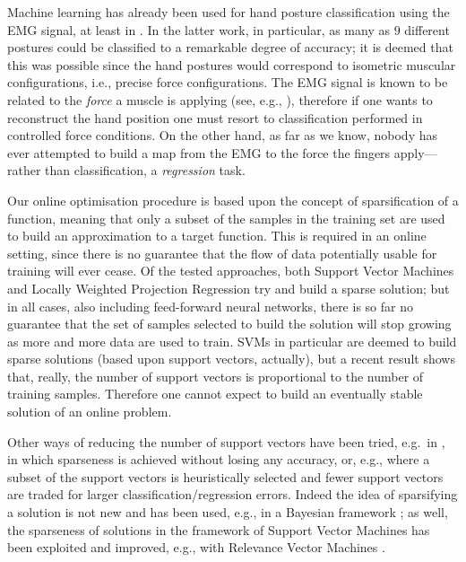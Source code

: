 Machine learning has already been used for hand posture classification
using the EMG signal, at least in \cite{dunlop,fukuda,smagt}. In the
latter work, in particular, as many as $9$ different postures could be
classified to a remarkable degree of accuracy; it is deemed that this
was possible since the hand postures would correspond to isometric
muscular configurations, i.e., precise force configurations. The EMG
signal is known to be related to the \emph{force} a muscle is applying
(see, e.g., \cite{deluca}), therefore if one wants to reconstruct the
hand position one must resort to classification performed in
controlled force conditions. On the other hand, as far as we know,
nobody has ever attempted to build a map from the EMG to the force the
fingers apply---rather than classification, a \emph{regression}
task.

Our online optimisation procedure is based upon the concept of
sparsification of a function, meaning that only a subset of the
samples in the training set are used to build an approximation to a
target function. This is required in an online setting, since there is
no guarantee that the flow of data potentially usable for training
will ever cease. Of the tested approaches, both Support Vector
Machines and Locally Weighted Projection Regression try and build a
sparse solution; but in all cases, also including feed-forward neural networks,
there is so far no guarantee that the set of samples selected to build
the solution will stop growing as more and more data are used to
train. SVMs in particular are deemed to build sparse solutions (based
upon support vectors, actually), but a recent result
\cite{Steinwart03} shows that, really, the number of support vectors
is proportional to the number of training samples. Therefore one
cannot expect to build an eventually stable solution of an online
problem.

Other ways of reducing the number of support vectors have been tried,
e.g.\ in \cite{bmvc}, in which sparseness is achieved without losing any
accuracy, or, e.g., \cite{LeeM01,KeerthiCDC06} where a subset of the
support vectors is heuristically selected and fewer support vectors are
traded for larger classification/regression errors. Indeed the idea of
sparsifying a solution is not new and has been used, e.g., in a
Bayesian framework \cite{figueiredo03adaptive}; as well, the
sparseness of solutions in the framework of Support Vector Machines
has been exploited and improved, e.g., with Relevance Vector Machines
\cite{tipping00relevance}.



